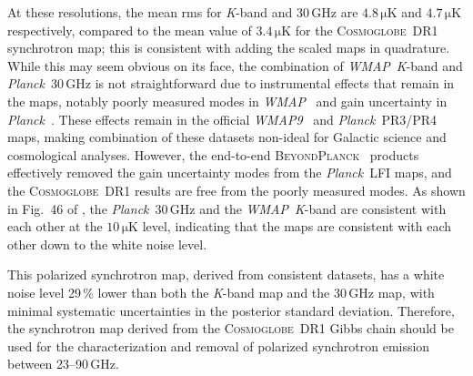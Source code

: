 \documentclass[twocolumn]{../../common/aa}
\def\WMAP{\emph{WMAP}}
\def\WMAPnine{\emph{WMAP9}}
\def\Planck{\emph{Planck}}
\newcommand{\bp}{\textsc{BeyondPlanck}}
\newcommand{\cosmoglobe}{\textsc{Cosmoglobe}}
\newcommand{\K}[0]{\textit K}
\begin{document}
At these resolutions, the mean rms for \K-band and 30\,GHz are $4.8\,\mathrm{\mu K}$ and $4.7\,\mathrm{\mu K}$ respectively, compared to the mean value of $3.4\,\mathrm{\mu K}$ for the \cosmoglobe\ DR1 synchrotron map; this is consistent with adding the scaled maps in quadrature.  While this may seem obvious on its face,  the combination of \WMAP\ \K-band and \Planck\ 30\,GHz is not straightforward due to instrumental effects that remain in the maps, notably poorly measured modes in \WMAP\ \citep{bennett2012,weiland:2018} and gain uncertainty in \Planck\ \citep{planck2016-l02}. These effects remain in the official \WMAPnine\ \citep{bennett2012} and \Planck\ PR3/PR4 \citep{planck2016-l02,planck2020-LVII} maps, making combination of these datasets non-ideal for Galactic science and cosmological analyses. However, the end-to-end \bp\ \citep{bp01} products effectively removed the gain uncertainty modes from the \Planck\ LFI maps, and the \cosmoglobe\ DR1 results \citep{watts2023_dr1} are free from the poorly measured modes. As shown in Fig.~46 of \citet{watts2023_dr1}, the \Planck\ 30\,GHz and the \WMAP\ \K-band are consistent with each other at the $10\,\mathrm{\mu K}$ level, indicating that the maps are consistent with each other down to the white noise level. 

This polarized synchrotron map, derived from consistent datasets, has a white noise level 29\,\% lower than both the \K-band map and the 30\,GHz map, with minimal systematic uncertainties in the posterior standard deviation. Therefore, the synchrotron map derived from the \cosmoglobe\ DR1 Gibbs chain should be used for the characterization and removal of polarized synchrotron emission between 23--90\,GHz.
\end{document}
